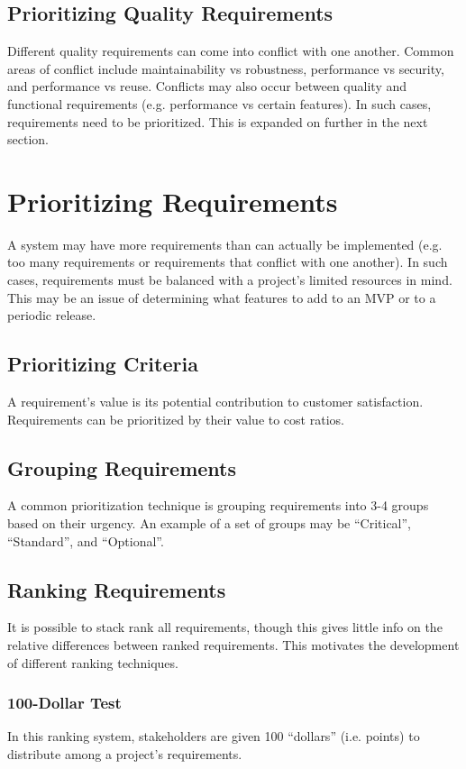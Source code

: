 \documentclass[12pt,titlepage]{article}
\let\stdsection\section
\renewcommand\section{\clearpage\stdsection}
\begin{document}
    \subsection{Prioritizing Quality Requirements}
      Different quality requirements can come into conflict with one another. Common areas of conflict include maintainability vs robustness, performance
      vs security, and performance vs reuse. Conflicts may also occur between quality and functional requirements (e.g. performance vs certain features).
      In such cases, requirements need to be prioritized. This is expanded on further in the next section.

  \section{Prioritizing Requirements}
    A system may have more requirements than can actually be implemented (e.g. too many requirements or requirements that conflict with one another).
    In such cases, requirements must be balanced with a project's limited resources in mind. This may be an issue of determining what features to add
    to an MVP or to a periodic release.

    \subsection{Prioritizing Criteria}
      A requirement's value is its potential contribution to customer satisfaction. Requirements can be prioritized by their value to cost ratios.

    \subsection{Grouping Requirements}
      A common prioritization technique is grouping requirements into 3-4 groups based on their urgency. An example of a set of groups may be
      ``Critical'', ``Standard'', and ``Optional''.

    \subsection{Ranking Requirements}
      It is possible to stack rank all requirements, though this gives little info on the relative differences between ranked requirements. This motivates
      the development of different ranking techniques.

      \subsubsection{100-Dollar Test}
        In this ranking system, stakeholders are given 100 ``dollars'' (i.e. points) to distribute among a project's requirements.
\end{document}
